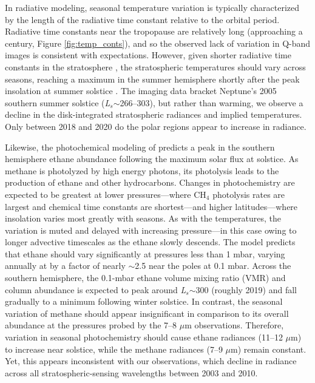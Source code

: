\documentclass[twocolumn,10pt]{aastex631}
\begin{document}
In radiative modeling, seasonal temperature variation is typically characterized by the length of the radiative time constant relative to the orbital period. Radiative time constants near the tropopause are relatively long (approaching a century, Figure \ref{fig:temp_conts}), and so the observed lack of variation in Q-band images is consistent with expectations.  However, given shorter radiative time constants in the stratosphere \citep{li2018high}, the stratospheric temperatures should vary across seasons, reaching a maximum in the summer hemisphere shortly after the peak insolation at summer solstice \citep{conrath1990temperature, greathouse2008general}. The imaging data bracket Neptune's 2005 southern summer solstice (\textit{L$_s$}$\sim$266--303), but rather than warming, we observe a decline in the disk-integrated stratospheric radiances and implied temperatures. Only between 2018 and 2020 do the polar regions appear to increase in radiance.

Likewise, the photochemical modeling of \citet{moses2018seasonal} predicts a peak in the southern hemisphere ethane abundance following the maximum solar flux at solstice. As methane is photolyzed by high energy photons, its photolysis leads to the production of ethane and other hydrocarbons.  Changes in photochemistry are expected to be greatest at lower pressures---where CH$_4$ photolysis rates are largest and chemical time constants are shortest---and higher latitudes---where insolation varies most greatly with seasons. As with the temperatures, the variation is muted and delayed with increasing pressure---in this case owing to longer advective timescales as the ethane slowly descends.  The \citet{moses2018seasonal} model predicts that ethane should vary significantly at pressures less than 1 mbar, varying annually at by a factor of nearly $\sim$2.5 near the poles at 0.1 mbar.  Across the southern hemisphere, the 0.1-mbar ethane volume mixing ratio (VMR) and column abundance is expected to peak around \textit{L$_s$}$\sim$300 (roughly 2019) and fall gradually to a minimum following winter solstice.  In contrast, the seasonal variation of methane should appear insignificant in comparison to its overall abundance at the pressures probed by the 7--8 $\mu$m observations. Therefore, variation in seasonal photochemistry should cause ethane radiances (11--12 $\mu$m) to increase near solstice, while the methane radiances (7--9 $\mu$m) remain constant. Yet, this appears inconsistent with our observations, which decline in radiance across all stratospheric-sensing wavelengths between 2003 and 2010. 
\end{document}
